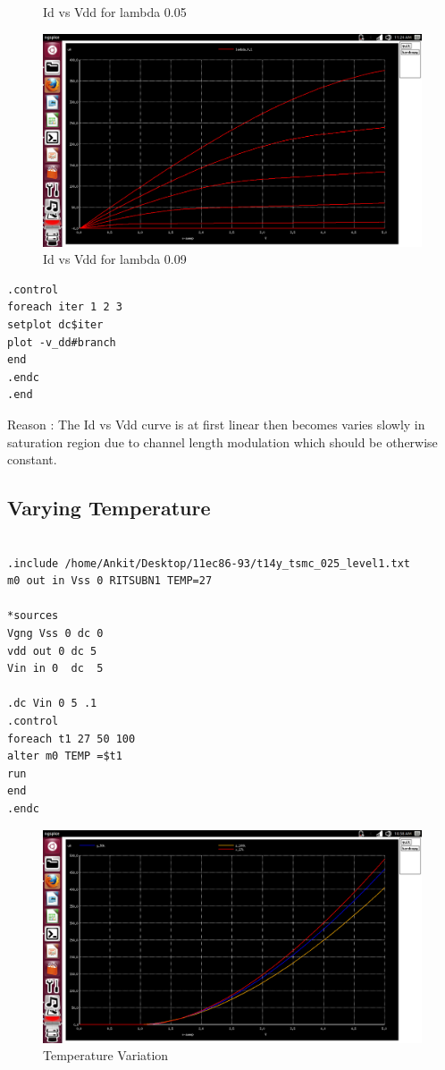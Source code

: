 \documentclass[12pt,a4paper]{article}
\begin{document}
\begin{center}
\begin{figure}[!ht]
\caption[Short]{Id vs Vdd for lambda 0.05}
\end{figure}
\clearpage
\begin{figure}[h]
\includegraphics[scale=0.34]{lambda1c.png}
\caption[Short]{Id vs Vdd for lambda 0.09}
\end{figure}
\begin{lstlisting}
.control	
foreach iter 1 2 3
setplot dc$iter
plot -v_dd#branch
end
.endc
.end

\end{lstlisting}


\vspace{5pt}
Reason : The Id vs Vdd curve is at first linear then becomes varies slowly in saturation region 
due to channel length modulation which should be otherwise constant. 

\clearpage
\subsection{Varying Temperature}
\begin{lstlisting}

.include /home/Ankit/Desktop/11ec86-93/t14y_tsmc_025_level1.txt
m0 out in Vss 0 RITSUBN1 TEMP=27

*sources
Vgng Vss 0 dc 0
vdd out 0 dc 5
Vin in 0  dc  5

.dc Vin 0 5 .1
.control
foreach t1 27 50 100
alter m0 TEMP =$t1
run
end 
.endc

\end{lstlisting}

\begin{figure}[!ht]
\centering
\includegraphics[scale=0.37]{temp_vary_pic.png}
\caption[Short]{Temperature Variation}
\end{figure}
\clearpage



\end{center}
\end{document}
